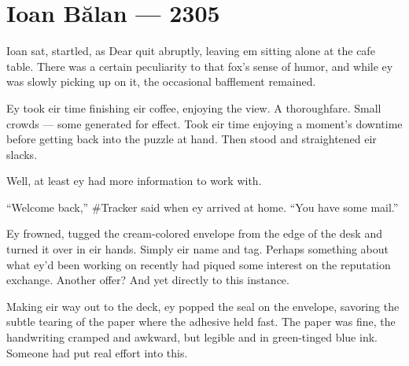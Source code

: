 \hypertarget{ioan-bux103lan-2305}{%
\chapter*{Ioan Bălan — 2305}\label{ioan-bux103lan-2305}}

Ioan sat, startled, as Dear quit abruptly, leaving em sitting alone at the cafe table. There was a certain peculiarity to that fox's sense of humor, and while ey was slowly picking up on it, the occasional bafflement remained.

Ey took eir time finishing eir coffee, enjoying the view. A thoroughfare. Small crowds — some generated for effect. Took eir time enjoying a moment's downtime before getting back into the puzzle at hand. Then stood and straightened eir slacks.

Well, at least ey had more information to work with.

``Welcome back,'' \#Tracker said when ey arrived at home. ``You have some mail.''

Ey frowned, tugged the cream-colored envelope from the edge of the desk and turned it over in eir hands. Simply eir name and tag. Perhaps something about what ey'd been working on recently had piqued some interest on the reputation exchange. Another offer? And yet directly to this instance.

Making eir way out to the deck, ey popped the seal on the envelope, savoring the subtle tearing of the paper where the adhesive held fast. The paper was fine, the handwriting cramped and awkward, but legible and in green-tinged blue ink. Someone had put real effort into this.

